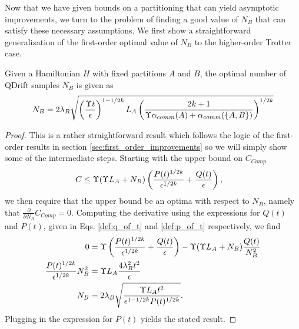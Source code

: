 Now that we have given bounds on a partitioning that can yield asymptotic improvements, we turn to the problem of finding a good value of $N_B$ that 
can satisfy these necessary assumptions. We first show a straightforward generalization of the first-order optimal value of $N_B$ to the higher-order Trotter case. 
\begin{lemma} \label{lem:optimal_nb_higher_order}
    Given a Hamiltonian $H$ with fixed partitions $A$ and $B$, the optimal number of QDrift samples $N_B$ is given as
    \begin{equation}
        N_B = 2 \lambda_B \sqrt{\left( \frac{\Upsilon t}{\epsilon} \right)^{1-1/2k} L_A \left( \frac{2k+1}{\Upsilon \alpha_{comm}(A) + \alpha_{comm}(\left\{ A,B \right\})} \right)^{1/2k}}
    \end{equation}
    \end{lemma}
\begin{proof}
    This is a rather straightforward result which follows the logic of the first-order results in section \ref{sec:first_order_improvements} so we will simply show some of the intermediate steps. Starting with the upper bound on $C_{Comp}$
    \begin{align}
        C &\leq \Upsilon (\Upsilon L_A + N_B) \left( \frac{P(t)^{1/2k}}{\epsilon^{1/2k}} + \frac{Q(t)}{\epsilon} \right) ,\end{align}
    we then require that the upper bound be an optima with respect to $N_B$, namely that $\frac{\partial}{\partial N_B} C_{Comp} = 0$. Computing the derivative using the expressions for $Q(t)$ and $P(t)$, given in Eqs. \eqref{def:q_of_t} and \eqref{def:p_of_t} respectively, we find
        \begin{align}
        0 &= \Upsilon \left( \frac{P(t)^{1/2k}}{\epsilon^{1/2k}} + \frac{Q(t)}{\epsilon} \right) - \Upsilon(\Upsilon L_A + N_B) \frac{Q(t)}{N_B^2} \\
        \frac{P(t)^{1/2k}}{\epsilon^{1/2k}} N_B^2 &= \Upsilon L_A \frac{4 \lambda_B^2 t^2}{\epsilon} \\
        N_B &= 2 \lambda_B \sqrt{\frac{\Upsilon L_A t^2}{\epsilon^{1-1/2k} P(t)^{1/2k}}}.
    \end{align}
    Plugging in the expression for $P(t)$ yields the stated result.
\end{proof}


